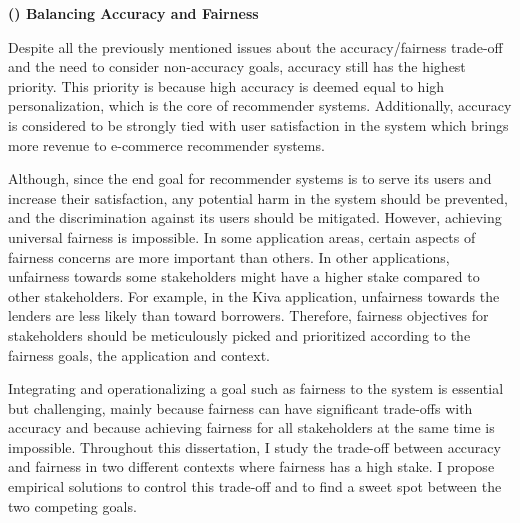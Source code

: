 \vspace{0.25cm}
\noindent \textbf{() Balancing Accuracy and Fairness}
\vspace{0.25cm}


Despite all the previously mentioned issues about the accuracy/fairness trade-off and the need to consider non-accuracy goals, accuracy still has the highest priority. This priority is because high accuracy is deemed equal to high personalization, which is the core of recommender systems. Additionally, accuracy is considered to be strongly tied with user satisfaction in the system which brings more revenue to e-commerce recommender systems. %


Although, since the end goal for recommender systems is to serve its users and increase their satisfaction, any potential harm in the system should be prevented, and the discrimination against its users should be mitigated. However, achieving universal fairness is impossible. In some application areas, certain aspects of fairness concerns are more important than others. In other applications, unfairness towards some stakeholders might have a higher stake compared to other stakeholders. For example, in the Kiva application, unfairness towards the lenders are less likely than toward borrowers. Therefore, fairness objectives for stakeholders should be meticulously picked and prioritized according to the fairness goals, the application and context.

Integrating and operationalizing a goal such as fairness to the system is essential but challenging, mainly because fairness can have significant trade-offs with accuracy and because achieving fairness for all stakeholders at the same time is impossible. Throughout this dissertation, I study the trade-off between accuracy and fairness in two different contexts where fairness has a high stake. I propose empirical solutions to control this trade-off and to find a sweet spot between the two competing goals. 



